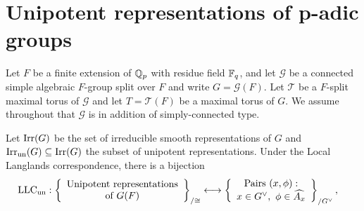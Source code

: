 \section{Unipotent representations of p-adic groups} \label{sec:padic_groups}

Let $F$ be a finite extension of $\mathbb{Q}_p$ with residue field $\mathbb{F}_q$, and let $\mathcal{G}$ be a connected simple algebraic $F$-group split over $F$ and write $G=\mathcal{G}(F)$. Let $\mathcal{T}$ be a $F$-split maximal torus of $\mathcal{G}$ and let $T=\mathcal{T}(F)$ be a maximal torus of $G$. We assume throughout that $\mathcal{G}$ is in addition of simply-connected type. 

Let $\mathrm{Irr}(G)$ be the set of irreducible smooth representations of $G$ and $\mathrm{Irr}_{\mathrm{un}}(G)\subseteq\mathrm{Irr}(G)$ the subset of unipotent representations. Under the Local Langlands correspondence, there is a bijection
\begin{align*}
    \mathrm{LLC}_{\mathrm{un}}:\left\{
    \begin{array}{c}
        \text{Unipotent representations} \\
        \text{of } G(F)
    \end{array}
    \right\}_{/\cong}
    &\longleftrightarrow
    \left\{
    \begin{array}{c}
        \text{Pairs }(x,\phi):\\
        x\in G^\vee,\ \phi\in\widehat{A_x}       
    \end{array}
    \right\}_{/G^\vee},
\end{align*}

